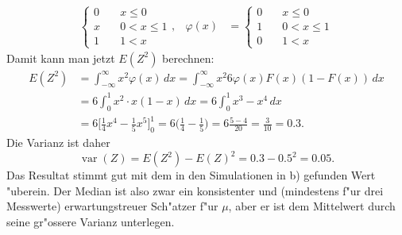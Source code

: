 \begin{loesung}
\begin{teilaufgaben}
\begin{align*}
\begin{cases}
0&\quad x \le 0\\
x&\quad 0<x\le1\\
1&\quad 1 < x
\end{cases},
&
\varphi(x)
&=\begin{cases}
0&\quad x \le 0\\
1&\quad 0<x\le1\\
0&\quad 1 < x
\end{cases}
\end{align*}
Damit kann man jetzt $E(Z^2)$ berechnen:
\begin{align*}
E(Z^2)&=\int_{-\infty}^{\infty}x^2 \varphi(x)\,dx=\int_{-\infty}^{\infty}
x^2
6\varphi(x)F(x)(1-F(x))
\,dx
\\
&=6\int_0^1x^2\cdot x(1-x)\,dx=6\int_0^1x^3-x^4\,dx\\
&=
6\biggl[
\frac14x^4-\frac15x^5
\biggr]_0^1=6\biggl(\frac14-\frac15\biggr)=6\frac{5-4}{20}=\frac3{10}=0.3.
\end{align*}
Die Varianz ist daher
\[
\operatorname{var}(Z)=E(Z^2)-E(Z)^2=0.3 - 0.5^2=0.05.
\]
Das Resultat stimmt gut mit dem in den Simulationen in b) gefunden Wert
"uberein. Der Median ist also zwar ein konsistenter und (mindestens f"ur
drei Messwerte) erwartungstreuer Sch"atzer f"ur $\mu$, aber er ist
dem Mittelwert durch seine gr"ossere Varianz unterlegen.
\end{teilaufgaben}
\end{loesung}

